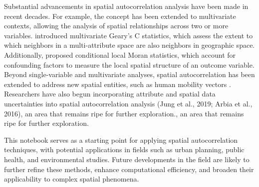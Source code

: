 \documentclass[
]{aft}
\begin{document}
Substantial advancements in spatial autocorrelation analysis have been
made in recent decades. For example, the concept has been extended to
multivariate contexts, allowing the analysis of spatial relationships
across two or more variables. \citep{Anselin2020} introduced
multivariate Geary's C statistics, which assess the extent to which
neighbors in a multi-attribute space are also neighbors in geographic
space. Additionally, \citep{Wolf2024} proposed conditional local Moran
statistics, which account for confounding factors to measure the local
spatial structure of an outcome variable. Beyond single-variable and
multivariate analyses, spatial autocorrelation has been extended to
address new spatial entities, such as human mobility vectors
\citep{liu2015measuring}. Researchers have also begun incorporating
attribute and spatial data uncertainties into spatial autocorrelation
analysis (Jung et al., 2019; Arbia et al., 2016), an area that remains
ripe for further exploration.\citep{jung:2019spatial, Arbia2016}, an
area that remains ripe for further exploration.

This notebook serves as a starting point for applying spatial
autocorrelation techniques, with potential applications in fields such
as urban planning, public health, and environmental studies. Future
developments in the field are likely to further refine these methods,
enhance computational efficiency, and broaden their applicability to
complex spatial phenomena.


  
\end{document}
